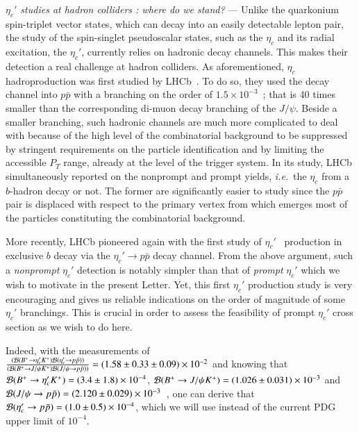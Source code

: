 \documentclass[showpacs,aps,PRL,twocolumn,footinbib,11]{revtex4-1}
\def\ie{{\it i.e.}}
\def\jpsi{J/\psi}
\def\etac{\eta_c}
\def\etacp{\eta_c'}
\newcommand{\Br}{{\cal B}}
\begin{document}
\textit{$\etacp$ studies at hadron colliders : where do we stand?} --- 
Unlike the quarkonium spin-triplet vector states, which can decay into an easily 
detectable lepton pair, the study of the spin-singlet pseudoscalar states, such as
the $\etac$ and its radial excitation, the $\etacp$, currently relies on 
hadronic decay channels. This makes their detection a real challenge 
at hadron colliders.  As aforementioned, $\etac$  hadroproduction was
first studied by LHCb~\cite{Aaij:2014bga}. To do so, they used the 
decay channel into $p\bar p$ with a branching on the order of $1.5 \times 10^{-3}$~\cite{Olive:2016xmw}; that
is 40 times smaller than the corresponding di-muon decay branching of the 
$J/\psi$. Beside a smaller branching, such hadronic channels are much more
complicated to deal with because of the high level of the combinatorial background to be
suppressed by stringent requirements on the particle identification and by limiting the 
accessible $P_T$ range, already at the level of the trigger system.
 In its study, LHCb simultaneously reported on 
the nonprompt and prompt yields, \ie\ the $\etac$ from a $b$-hadron decay
or not. The former are significantly easier to study since the $p\bar p$ pair is displaced
with respect to the primary vertex from which emerges most of the particles constituting 
the combinatorial background.

More recently, LHCb pioneered again with the first study of $\etacp$~\cite{Aaij:2016kxn} production
in exclusive $b$ decay via the $\etacp \to p \bar p$ decay channel. From the above argument, such a {\it nonprompt} $\etacp$ detection is notably simpler than that of {\it prompt} $\etacp$ 
which we wish to motivate in the present Letter. 
Yet, this first $\etacp$ production study is very encouraging and gives us reliable 
indications on the order of magnitude of some  $\etacp$ branchings.
This is crucial in order to assess the feasibility of prompt $\etacp$ cross section 
as we wish to do here.

Indeed, with the measurements of $\frac{(\Br (B^+\to \etacp K^+)  \Br (\etacp\to p \bar p))}{(\Br (B^+\to \jpsi K^+)\Br (\jpsi\to p \bar p))}
=(1.58 \pm 0.33 \pm 0.09)\times 10^{-2}$ and knowing
that  $\Br (B^+\to \etacp K^+)=(3.4 \pm 1.8) \times 10^{-4}$, 
$\Br (B^+\to \jpsi K^+)=(1.026 \pm 0.031) \times 10^{-3}$ and
$\Br (\jpsi\to p \bar p)=(2.120 \pm 0.029 ) \times 10^{-3}$~\cite{Olive:2016xmw}, 
one can derive that $\Br (\etacp\to p \bar p) = (1.0 \pm 0.5) \times 10^{-4}$, 
which we will use instead of the current PDG upper limit of $10^{-4}$.
\end{document}
